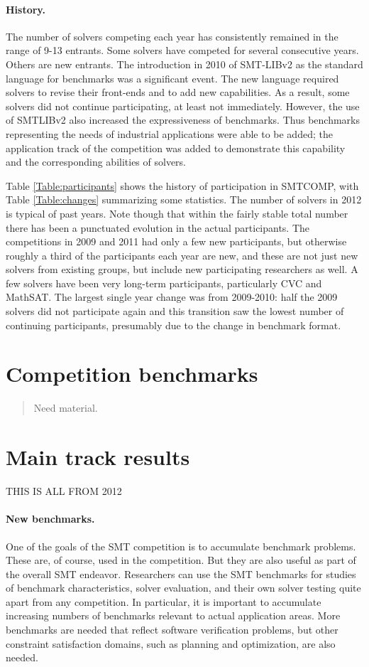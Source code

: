 \documentclass[twosize,11pt]{article}
\newcommand{\comment}[2]{\begin{quote}\sc #1\marginpar{\textcolor{red}{$\ast^{\mbox{#2}}$}}\end{quote}}
\newcommand{\tjark}[1]{\comment{#1}{TW}}
\newcommand{\tjarkx}[1]{\tjark{#1}}
\begin{document}
\paragraph{History.} The number of solvers competing each year has consistently remained in the range of 9-13 entrants.
Some solvers have competed for several consecutive years. Others are new entrants. The introduction in 2010 of SMT-LIBv2 as the standard language for benchmarks was a significant event. The new language required solvers to revise their front-ends and to add new capabilities.
As a result, some solvers did not continue participating, at least not immediately. However, the use of SMTLIBv2 also increased the expressiveness of benchmarks. Thus benchmarks representing the needs of industrial applications were able to be added; 
the application track of the competition was added to demonstrate this capability and the corresponding abilities of solvers.


Table \ref{Table:participants} shows the history of participation in SMTCOMP, with Table \ref{Table:changes} summarizing some statistics. The number of solvers in 2012 is typical of past years. Note though that within the fairly stable total number there has been a punctuated evolution in the actual participants. The competitions in 2009 and 2011 had only a few new participants, but otherwise roughly a third of the participants each year are new, and these are not just new solvers from existing groups, but include new participating researchers as well. A few solvers have been very long-term participants, particularly CVC and MathSAT. The largest single year change was from 2009-2010: half the 2009 solvers did not participate again and this transition saw the lowest number of continuing participants, presumably due to the change in benchmark format.

\section{Competition benchmarks}
\label{sec:benchmarks}

\tjarkx{Need material.}

\section{Main track results}
\label{sec:main-results}

THIS IS ALL FROM 2012

\paragraph{New benchmarks.} One of the goals of the SMT competition is to accumulate benchmark problems. These are, of course, used in the competition. But they are also useful as part of the overall SMT endeavor. Researchers can use the SMT benchmarks for studies of benchmark characteristics, solver evaluation, and their own solver testing quite apart from any competition. In particular, it is important to accumulate increasing numbers of benchmarks relevant to actual application areas. More benchmarks are needed that reflect software verification problems, but other constraint satisfaction domains, such as planning and optimization, are also needed.
\end{document}
